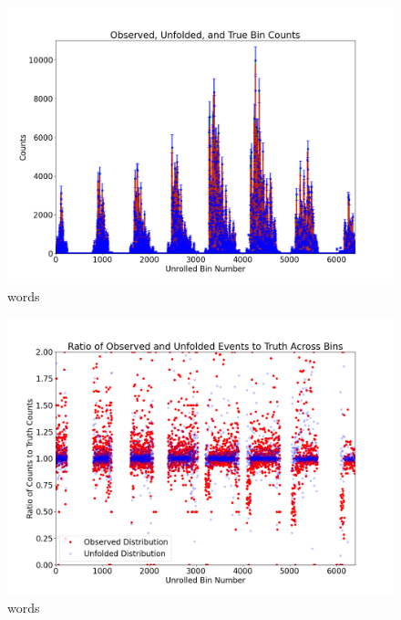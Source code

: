     
    \begin{figure}[ht]
    \centering
    \includegraphics[trim={0 0 0 0},clip,width=\textwidth]{Chapters/Ch5-Further/0_IBU/pics/complete/observed_unfolded_and_true_bin_counts.png}
    \caption[words]{words}
    \label{fig:ibu2}
    \end{figure}
    
    \begin{figure}[ht]
    \centering
    \includegraphics[trim={0 0 0 0},clip,width=\textwidth]{Chapters/Ch5-Further/0_IBU/pics/complete/ratio_of_observed_and_unfolded_events_to_truth_across_bins.png}
    \caption[words]{words}
    \label{fig:ibu3}
    \end{figure}

